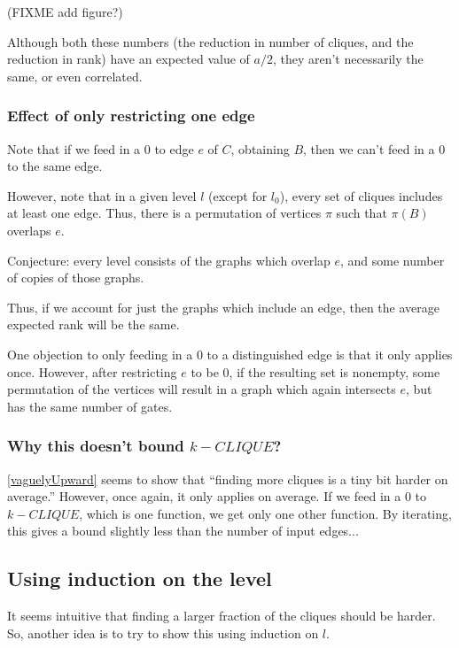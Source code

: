 \documentclass[12pt]{article}
\theoremstyle{definition}
\begin{document}
(FIXME add figure?)


Although both these numbers (the reduction in number of cliques, and
the reduction in rank) have an expected value of $a/2$,
they aren't necessarily the same, or even correlated.


\subsubsection{Effect of only restricting one edge}

Note that if we feed in a 0 to edge $e$ of $C$, obtaining $B$, then
we can't feed in a 0 to the same edge.

However, note that in a given level $l$ (except for $l_0$),
every set of cliques includes at least one edge. Thus, there is
a permutation of vertices $\pi$ such that $\pi(B)$ overlaps $e$.

Conjecture: every level consists of the graphs which overlap $e$,
and some number of copies of those graphs.

Thus, if we account for just the graphs which include an edge,
then the average expected rank will be the same.

 



One objection to only feeding in a 0 to a distinguished edge is that
it only applies once. However, after restricting $e$ to be 0,
if the resulting set is nonempty,
some permutation of the vertices will result in a graph which
again intersects $e$, but has the same number of gates. 






\subsubsection{Why this doesn't bound $k-CLIQUE$?}

\ref{vaguelyUpward} seems to show that ``finding more cliques is
a tiny bit harder on average.'' However, once again, it only applies
on average. If we feed in a 0 to $k-CLIQUE$, which is one function,
we get only one other function. By iterating, this gives a bound
slightly less than the number of input edges...

\subsection{Using induction on the level}

It seems intuitive that finding a larger fraction of the cliques
should be harder.
So, another idea is to try to show this using induction on $l$.
\end{document}
